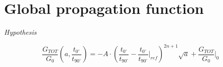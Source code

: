 \documentclass[review]{elsarticle}
\begin{document}
\section{Global propagation function}

\em{Hypothesis}

\begin{equation}
\frac{G_{TOT}}{G_{0}}\left(a,\frac{t_{0^{\circ}}}{t_{90^{\circ}}}\right)=-A\cdot\left(\frac{t_{0^{\circ}}}{t_{90^{\circ}}}-\frac{t_{0^{\circ}}}{t_{90^{\circ}}}|_{ref}\right)^{2n+1}\sqrt{a}+\frac{G_{TOT}}{G_{0}}|_{0}
\end{equation}
\end{document}
